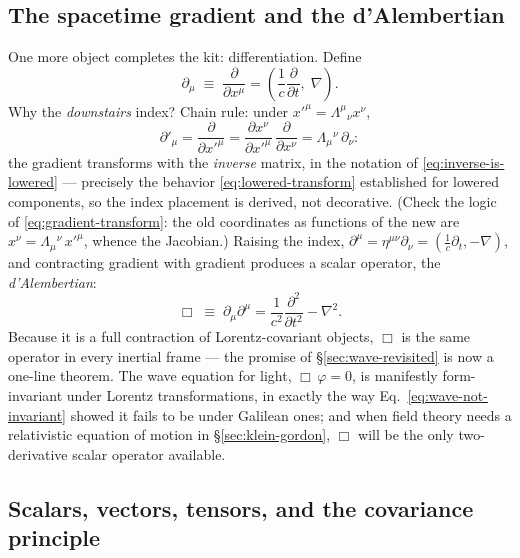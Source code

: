 \documentclass[11pt]{article}
\theoremstyle{plain}
\theoremstyle{definition}
\theoremstyle{remark}
\newcommand{\pd}[2]{\frac{\partial #1}{\partial #2}}
\begin{document}
\subsection{The spacetime gradient and the d'Alembertian}
\label{sec:gradient}

One more object completes the kit: differentiation. Define
\begin{equation}
  \partial_\mu \;\equiv\; \pd{}{x^\mu}
  = \left(\frac{1}{c}\pd{}{t},\; \nabla\right).
\end{equation}
Why the \emph{downstairs} index? Chain rule: under
$x'^\mu = \Lambda^\mu{}_\nu x^\nu$,
\begin{equation}
  \partial'_\mu
  = \pd{}{x'^\mu}
  = \pd{x^\nu}{x'^\mu}\,\pd{}{x^\nu}
  = \Lambda_\mu{}^\nu\, \partial_\nu :
  \label{eq:gradient-transform}
\end{equation}
the gradient transforms with the \emph{inverse} matrix, in the
notation of \eqref{eq:inverse-is-lowered} --- precisely the behavior
\eqref{eq:lowered-transform} established for lowered components, so
the index placement is derived, not decorative. (Check the logic of
\eqref{eq:gradient-transform}: the old coordinates as functions of
the new are
$x^\nu = \Lambda_\mu{}^\nu\, x'^\mu$, whence the Jacobian.)
Raising the index, $\partial^\mu = \eta^{\mu\nu}\partial_\nu = 
(\tfrac1c \partial_t, -\nabla)$, and contracting gradient with
gradient produces a scalar operator, the \emph{d'Alembertian}:
\begin{equation}
  \boxed{\;
  \Box \;\equiv\; \partial_\mu \partial^\mu
  = \frac{1}{c^2}\pd{^2}{t^2} - \nabla^2 .
  \;}
  \label{eq:dalembertian}
\end{equation}
Because it is a full contraction of Lorentz-covariant objects, $\Box$
is the same operator in every inertial frame --- the promise of
\S\ref{sec:wave-revisited} is now a one-line theorem. The wave equation
for light, $\Box\,\varphi = 0$, is manifestly form-invariant under
Lorentz transformations, in exactly the way
Eq.~\eqref{eq:wave-not-invariant} showed it fails to be under Galilean
ones; and when field theory needs a relativistic equation of motion in
\S\ref{sec:klein-gordon}, $\Box$ will be the only two-derivative
scalar operator available.

\subsection{Scalars, vectors, tensors, and the covariance principle}
\label{sec:tensors}
\end{document}
